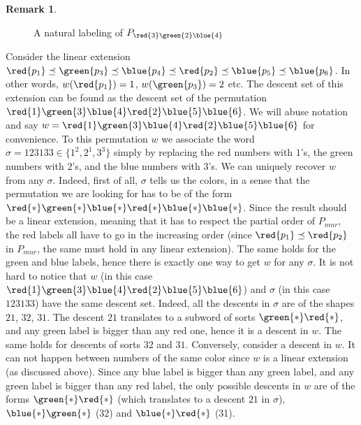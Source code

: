 \documentclass[12pt]{amsart}
\numberwithin{equation}{section}
\theoremstyle{definition}
\newtheorem{remark}[theorem]{Remark}
\begin{document}
\begin{remark}
\begin{figure}[H]
\caption{A natural labeling of $P_{\red{3}\green{2}\blue{4}}$}
\label{fig: labelling}
\end{figure}
Consider the linear extension $\red{p_1}\preceq \green{p_3}\preceq\blue{p_4}\preceq\red{p_2}\preceq\blue{p_5}\preceq\blue{p_6}$. In other words, $w(\red{p_1})=1$, $w(\green{p_3})=2$ etc. The descent set of this extension can be found as the descent set of the permutation $\red{1}\green{3}\blue{4}\red{2}\blue{5}\blue{6}$. We will abuse notation and say $w=\red{1}\green{3}\blue{4}\red{2}\blue{5}\blue{6}$ for convenience.
To this permutation $w$ we associate the word $\sigma=123133\in \{1^2,2^1,3^3\}$ simply by replacing  the red numbers with $1$'s, the green numbers with $2$'s, and the blue numbers with $3$'s. We can uniquely recover $w$ from any $\sigma$. Indeed, first of all, $\sigma$ tells us the colors, in a sense that the permutation we are looking for has to be of the form $\red{*}\green{*}\blue{*}\red{*}\blue{*}\blue{*}$. Since the result should be a linear extension, meaning that it has to respect the partial order of $P_{mnr}$, the red labels all have to go in the increasing order (since $\red{p_1}\preceq \red{p_2}$ in $P_{mnr}$, the same must hold in any linear extension). The same holds for the green and blue labels, hence there is exactly one way to get $w$ for any $\sigma$. It is not hard to notice that $w$ (in this case $\red{1}\green{3}\blue{4}\red{2}\blue{5}\blue{6}$) and $\sigma$ (in this case $123133$) have the same descent set. Indeed, all the descents in $\sigma$ are of the shapes $21$, $32$, $31$. The descent $21$ translates to a subword of sorts $\green{*}\red{*}$, and any green label is bigger than any red one, hence it is a descent in $w$. The same holds for descents of sorts $32$ and $31$. Conversely, consider a descent in $w$. It can not happen between numbers of the same color since $w$ is a linear extension (as discussed above). Since any blue label is bigger than any green label, and any green label is bigger than any red label, the only possible descents in $w$ are of the forms $\green{*}\red{*}$ (which translates to a descent $21$ in $\sigma$), $\blue{*}\green{*}$ (32) and $\blue{*}\red{*}$ (31). 

\end{remark}
 
\end{document}
